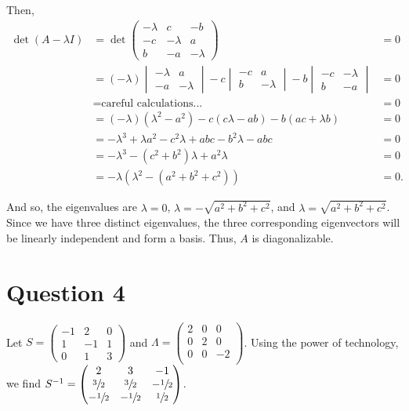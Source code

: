 \documentclass[12pt]{article}
\begin{document}
Then,
\begin{align*}
    \det(A-\lambda I) &= \det\begin{pmatrix} 
        -\lambda & c & -b \\ 
        -c & -\lambda & a \\ 
        b & -a & -\lambda 
    \end{pmatrix}
    &= 0 \\
    &= (-\lambda) \begin{vmatrix} 
        -\lambda & a \\ 
        -a & -\lambda 
    \end{vmatrix}
    - c \begin{vmatrix} 
        -c & a \\ 
        b & -\lambda 
    \end{vmatrix}
    - b \begin{vmatrix} 
        -c & -\lambda \\ 
        b & -a 
    \end{vmatrix} &= 0\\
    &= \text{careful calculations...} &= 0\\
    &= (-\lambda)(\lambda^2 - a^2) - c(c\lambda - ab) - b(ac + \lambda b) &= 0\\
    &= -\lambda^3 + \lambda a^2 - c^2\lambda + abc - b^2\lambda - abc &= 0 \\
    &= -\lambda^3 - (c^2 + b^2)\lambda + a^2\lambda &= 0\\
    &= -\lambda \left( \lambda^2 - (a^2 + b^2 + c^2) \right) &= 0.
\end{align*}

And so, the eigenvalues are $\lambda=0$, $\lambda=-\sqrt{a^2 + b^2 + c^2}$, and $\lambda=\sqrt{a^2 + b^2 + c^2}$. Since we have three distinct eigenvalues, the three corresponding eigenvectors will be linearly independent and form a basis. Thus, $A$ is diagonalizable.

\section*{Question 4}

Let $S=\begin{pmatrix}
    -1 & 2 & 0 \\
    1 & -1 & 1 \\
    0 & 1 & 3
\end{pmatrix}$ and $\Lambda=\begin{pmatrix}
    2 & 0 & 0 \\
    0 & 2 & 0 \\
    0 & 0 & -2 \\
\end{pmatrix}$. Using the power of technology, we find $S^{-1} = \begin{pmatrix}
    2 & 3 & -1 \\
    \sfrac{3}{2} & \sfrac{3}{2} & -\sfrac{1}{2} \\
    -\sfrac{1}{2} & -\sfrac{1}{2} & \sfrac{1}{2}
\end{pmatrix}$.
\end{document}
